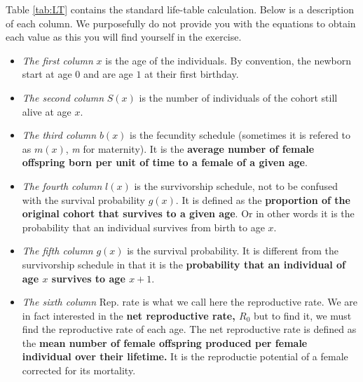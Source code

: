 \documentclass{article}\usepackage[]{graphicx}\usepackage[]{color}
\begin{document}
Table \ref{tab:LT} contains the standard life-table calculation. Below is a description of each column. We purposefully do not provide you with the equations to obtain each value as this you will find yourself in the exercise. 
\begin{itemize}

\item \textit{The first column} $x$ is the age of the individuals. By convention, the newborn start at age $0$ and are age $1$ at their first birthday. 

\item \textit{The second column} $S(x)$ is the number of individuals of the cohort still alive at age $x$. 

\item \textit{The third column} $b(x)$ is the fecundity schedule (sometimes it is refered to as $m(x)$, \textit{m} for maternity). It is the \textbf{average number of female offspring born per unit of time to a female of a given age}. 

\item \textit{The fourth column} $l(x)$ is the survivorship schedule, not to be confused with the survival probability $g(x)$. It is defined as the \textbf{proportion of the original cohort that survives to a given age}. Or in other words it is the probability that an individual survives from birth to age $x$. 

\item \textit{The fifth column} $g(x)$ is the survival probability. It is different from the survivorship schedule in that it is the \textbf{probability that an individual of age $x$ survives to age $x+1$}. 

\item \textit{The sixth column} Rep. rate is what we call here the reproductive rate. We are in fact interested in the \textbf{net reproductive rate, $R_0$} but to find it, we must find the reproductive rate of each age. The net reproductive rate is defined as the \textbf{mean number of female offspring produced per female individual over their lifetime.} It is the reproductie potential of a female corrected for its mortality.
\end{itemize}
\end{document}
